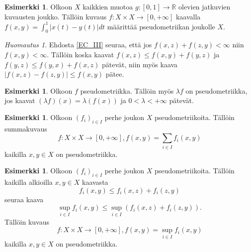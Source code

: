 \documentclass[12pt,a4paper,leqno]{report}
\newcommand{\R}{\mathbb{R}}
\theoremstyle{plain}
\theoremstyle{definition}
\newtheorem{esim}[equation]{Esimerkki}
\theoremstyle{remark}
\newtheorem{huom}[equation]{Huomautus}
\begin{document}
\begin{esim}%
Olkoon $X$ kaikkien muotoa $g\colon [0,1]\rightarrow \R$ olevien jatkuvien kuvausten joukko. %
Tällöin kuvaus $f\colon X\times X\rightarrow [0,+\infty]$ kaavalla $f(x,y)=\int_0^1 |x(t)-y(t)|dt$ määrittää pseudometriikan joukolle $X$.
\end{esim}
\begin{huom}
Ehdosta \ref{EC_III} seuraa, että jos $f(x,z)+f(z,y)<\infty$ niin $f(x,y)<\infty$. Tällöin koska kaavat $f(x,z)\leq f(x,y)+f(y,z)$ ja $f(y,z)\leq f(y,x)+f(x,z)$ pätevät, niin myös kaava $|f(x,z)-f(z,y)|\leq f(x,y)$ pätee.
\end{huom}
\begin{esim}%
Olkoon $f$ pseudometriikka. Tällöin myös $\lambda f$ on pseudometriikka, jos kaavat $(\lambda f) (x)=\lambda (f (x))$ ja $0<\lambda <+\infty$ pätevät.
\end{esim}
\begin{esim}%
Olkoon $(f_i)_{i\in I}$ perhe joukon $X$ pseudometriikoita. 
Tällöin summakuvaus 
\begin{equation*}
f\colon X\times X\rightarrow [0,+\infty],
f(x,y)=\sum_{i\in I}f_i(x,y)%
\end{equation*} 
kaikilla $x,y\in X$ 
on pseudometriikka.
\end{esim}
\begin{esim}%
Olkoon $(f_i)_{i\in I}$ perhe joukon $X$ pseudometriikoita. 
Tällöin kaikilla alkioilla $x,y\in X$ kaavasta $$f_i(x,y)\leq f_i(x,z)+f_i(z,y)$$ seuraa kaava $$\sup_{i\in I}f_i(x,y)\leq \sup_{i\in I}\left(f_i(x,z)+f_i(z,y)\right).$$
Tällöin kuvaus 
\begin{equation*}
f\colon X\times X\rightarrow [0,+\infty],
f(x,y)=\sup_{i\in I}f_i(x,y)
\end{equation*} 
kaikilla $x,y\in X$ on pseudometriikka. 
\end{esim}
\end{document}
